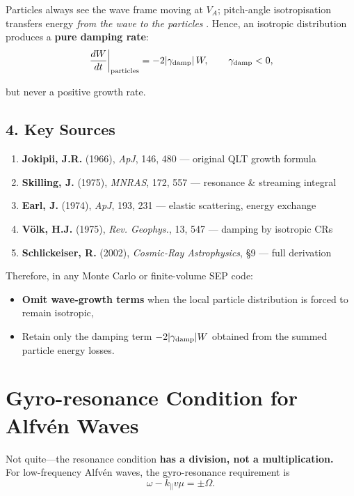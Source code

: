 Particles always see the wave frame moving at $V_A$; pitch-angle isotropisation transfers energy \textit{from the wave to the particles} \cite{Earl1974, Voelk1975}.  
Hence, an isotropic distribution produces a \textbf{pure damping rate}:
\begin{equation}
\left.\frac{dW}{dt}\right|_{\text{particles}} = -2|\gamma_{\rm damp}|\,W,
\qquad \gamma_{\rm damp} < 0,
\end{equation}

but never a positive growth rate.

\subsection*{4. Key Sources}

\begin{enumerate}
    \item \textbf{Jokipii, J.R.} (1966), \textit{ApJ}, 146, 480 — original QLT growth formula
    \item \textbf{Skilling, J.} (1975), \textit{MNRAS}, 172, 557 — resonance \& streaming integral
    \item \textbf{Earl, J.} (1974), \textit{ApJ}, 193, 231 — elastic scattering, energy exchange
    \item \textbf{Völk, H.J.} (1975), \textit{Rev. Geophys.}, 13, 547 — damping by isotropic CRs
    \item \textbf{Schlickeiser, R.} (2002), \textit{Cosmic-Ray Astrophysics}, §9 — full derivation
\end{enumerate}

\medskip

\noindent Therefore, in any Monte Carlo or finite-volume SEP code:
\begin{itemize}
    \item \textbf{Omit wave-growth terms} when the local particle distribution is forced to remain isotropic,
    \item Retain only the damping term $-2|\gamma_{\rm damp}|W$ obtained from the summed particle energy losses.
\end{itemize}

\section*{Gyro-resonance Condition for Alfvén Waves}

Not quite—the resonance condition \textbf{has a division, not a multiplication.} \\
For low-frequency Alfvén waves, the gyro-resonance requirement is
\[
\boxed{
\omega - k_\parallel v \mu = \pm \Omega
} .
\]

